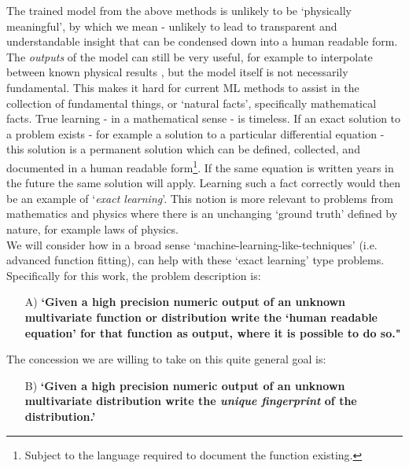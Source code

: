 \documentclass{article}
\begin{document}
The trained model from the above methods is unlikely to be `physically meaningful', by which we mean - unlikely to lead to transparent and understandable insight that can be condensed down into a human readable form. The \emph{outputs} of the model can still be very useful, for example to interpolate between known physical results \cite{Belisle2015}, but the model itself is not necessarily fundamental. This makes it hard for current ML methods to assist in the collection of fundamental things, or `natural facts', specifically mathematical facts. True learning - in a mathematical sense - is timeless. If an exact solution to a problem exists - for example a solution to a particular differential equation - this solution is a permanent solution which can be defined,  collected, and documented in a human readable form\footnote{Subject to the language required to document the function existing.}. If the same equation is written years in the future the same solution will apply. Learning such a fact correctly would then be an example of `\emph{exact learning}'. This notion is more relevant to problems from mathematics and physics where there is an unchanging `ground truth' defined by nature, for example laws of physics. \\


We will consider how in a broad sense `machine-learning-like-techniques' (i.e. advanced function fitting), can help with these `exact learning' type problems. Specifically for this work, the problem description is: 
\begin{enumerate}
\item[A)] \textbf{`Given a high precision numeric output of an unknown multivariate function or distribution write the `human readable equation' for that function as output, where it is possible to do so."}
\end{enumerate}
The concession we are willing to take on this quite general goal is:
\begin{enumerate}
\item[B)] \textbf{`Given a high precision numeric output of an unknown multivariate distribution write the \emph{unique fingerprint} of the distribution.'}
\end{enumerate}
\end{document}

